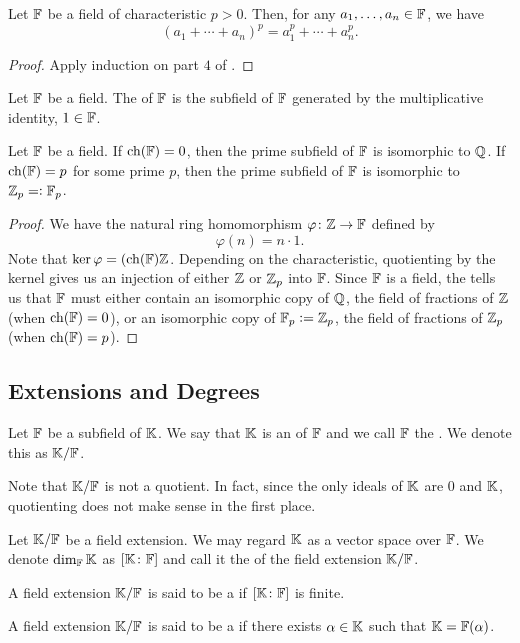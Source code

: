 \begin{cor} \label{cor:p-power-of-sum}
    Let $\mathbb{F}$ be a field of characteristic $p > 0$. Then, for any $a_1,\ldots,a_n \in \mathbb{F}$, we have
    \[
        (a_1 + \cdots + a_n)^p = a_1^p + \cdots + a_n^p.
    \]
\end{cor}
\begin{proof}
    Apply induction on part $4$ of .
\end{proof}
\begin{defn}
    Let $\mathbb{F}$ be a field. The  of $\mathbb{F}$ is the subfield of $\mathbb{F}$ generated by the multiplicative identity, $1 \in \mathbb{F}$.
\end{defn}

\begin{prop}
    Let $\mathbb{F}$ be a field. If $\operatorname{ch}(\mathbb{F}) = 0$, then the prime subfield of $\mathbb{F}$ is isomorphic to $\mathbb{Q}$. If $\operatorname{ch}(\mathbb{F}) = p$ for some prime $p$, then the prime subfield of $\mathbb{F}$ is isomorphic to $\mathbb{Z}_p =\vcentcolon \mathbb{F}_p$.
\end{prop}

\begin{proof}
    We have the natural ring homomorphism $\varphi \colon \mathbb{Z} \to \mathbb{F}$ defined by
    \[
        \varphi(n) = n \cdot 1.
    \]
    Note that $\ker\varphi = (\operatorname{ch}(\mathbb{F}) \mathbb{Z}$. Depending on the characteristic, quotienting by the kernel gives us an injection of either $\mathbb{Z}$ or $\mathbb{Z}_p$ into $\mathbb{F}$. Since $\mathbb{F}$ is a field, the  tells us that $\mathbb{F}$ must either contain an isomorphic copy of $\mathbb{Q}$, the field of fractions of $\mathbb{Z}$ (when $\operatorname{ch}(\mathbb{F}) = 0$), or an isomorphic copy of $\mathbb{F}_p \vcentcolon= \mathbb{Z}_p$, the field of fractions of $\mathbb{Z}_p$ (when $\operatorname{ch}(\mathbb{F}) = p$).
\end{proof}

\subsection{Extensions and Degrees}

\begin{defn}
    Let $\mathbb{F}$ be a subfield of $\mathbb{K}$. We say that $\mathbb{K}$ is an  of $\mathbb{F}$ and we call $\mathbb{F}$ the . We denote this as $\mathbb{K}/\mathbb{F}$.
\end{defn}
\begin{rem}
    Note that $\mathbb{K}/\mathbb{F}$ is not a quotient. In fact, since the only ideals of $\mathbb{K}$ are $0$ and $\mathbb{K}$, quotienting does not make sense in the first place. 
\end{rem}
\begin{defn}
    Let $\mathbb{K}/\mathbb{F}$ be a field extension. We may regard $\mathbb{K}$ as a vector space over $\mathbb{F}$. We denote $\dim_{\mathbb{F}}\mathbb{K}$ as $[\mathbb{K} \colon \mathbb{F}]$ and call it the  of the field extension $\mathbb{K}/\mathbb{F}$.
\end{defn}
\begin{defn}
    A field extension $\mathbb{K}/\mathbb{F}$ is said to be a  if $[\mathbb{K} \colon \mathbb{F}]$ is finite.
\end{defn}
\begin{defn}
    A field extension $\mathbb{K}/\mathbb{F}$ is said to be a  if there exists $\alpha \in \mathbb{K}$ such that $\mathbb{K} = \mathbb{F}(\alpha)$.
\end{defn}

